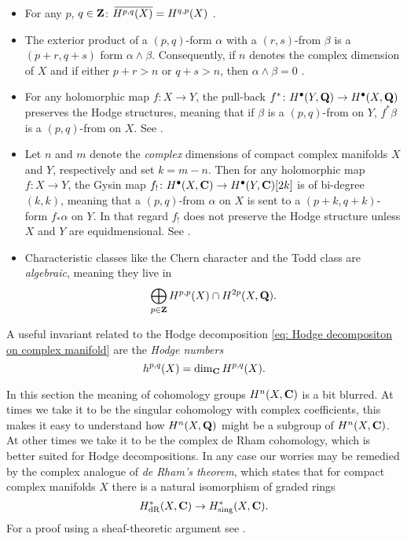 \begin{itemize}[label = $\vartriangleright$ ]
    \item{For any $p$, $q \in \mathbf Z$: $\,\overline{\!{H^{p,q}(X)}} = H^{q,p}(X)$ \cite[\S II, Corollary 6.12]{Voisin2002}.}
    \item{The exterior product of a $(p,q)$-form $\alpha$ with a $(r,s)$-from $\beta$ is a $(p+r, q+s)$ form $\alpha \wedge \beta$. Consequently, if $n$ denotes the complex dimension of $X$ and if either $p+r > n$ or $q + s > n$, then $\alpha \wedge \beta = 0$ \cite[\S II, Corollary 6.15]{Voisin2002}}.
    \item{For any holomorphic map $f \colon X \to Y$, the pull-back $f^* \colon H^{\bullet}(Y, \mathbf Q) \to H^{\bullet}(X, \mathbf Q)$ preserves the Hodge structures, meaning that if $\beta$ is a $(p,q)$-from on $Y$, $f^*\beta$ is a $(p,q)$-from on $X$. See \cite[\S 7.3.2]{Voisin2002}.}
    \item{Let $n$ and $m$ denote the \emph{complex} dimensions of compact complex manifolds $X$ and $Y$, respectively and set $k = m-n$. Then for any holomorphic map $f \colon X \to Y$, the Gysin map $f_! \colon H^{\bullet}(X, \mathbf C) \to H^{\bullet}(Y, \mathbf C)[2k]$ is of bi-degree $(k,k)$, meaning that a $(p,q)$-from $\alpha$ on $X$ is sent to a $(p+k, q+k)$-form $f_*\alpha$ on $Y$. In that regard $f_!$ does not preserve the Hodge structure unless $X$ and $Y$ are equidmensional. See \cite[\S 7.3.2]{Voisin2002}.}
    \item{Characteristic classes like the Chern character and the Todd class are \emph{algebraic}, meaning they live in
    \[
        \bigoplus_{p \in \mathbf Z} H^{p,p}(X) \cap H^{2p}(X, \mathbf Q).
    \]} 
\end{itemize} 

A useful invariant related to the Hodge decomposition \eqref{eq: Hodge decompositon on complex manifold} are the \emph{Hodge numbers}
\[
    h^{p,q}(X) = \dim_{\mathbf C} H^{p,q}(X).
\]

\begin{remark}
    In this section the meaning of cohomology groups $H^{n}(X, \mathbf C)$ is a bit blurred. At times we take it to be the singular cohomology with complex coefficients, this makes it easy to understand how $H^{n}(X, \mathbf Q)$ might be a subgroup of $H^{n}(X, \mathbf C)$. At other times we take it to be the complex de Rham cohomology, which is better suited for Hodge decompositions. In any case our worries may be remedied by the complex analogue of \emph{de Rham's theorem}, which states that for compact complex manifolds $X$ there is a natural isomorphism of graded rings
    \[
        H^*_{\operatorname{dR}}(X, \mathbf C) \to H^*_{\operatorname{sing}}(X, \mathbf C).
    \]
    For a proof using a sheaf-theoretic argument see \cite[p.\ 43--45]{GriffithsHarris1994}.
\end{remark}

